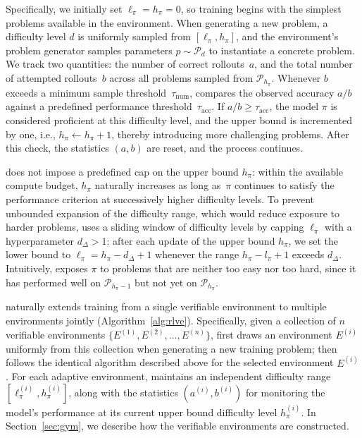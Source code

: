 \documentclass{article}
\theoremstyle{plain}
\theoremstyle{definition}
\theoremstyle{remark}
\begin{document}
Specifically, we initially set $\ell_\pi = h_\pi = 0$, so training begins with the simplest problems available in the environment.
When generating a new problem, a difficulty level $d$ is uniformly sampled from $[\ell_\pi, h_\pi]$, and the environment’s problem generator samples parameters $p \sim \mathcal{P}_{d}$ to instantiate a concrete problem.
We track two quantities: the number of correct rollouts~$a$, and the total number of attempted rollouts~$b$ across all problems sampled from $\mathcal{P}_{h_\pi}$.
Whenever $b$ exceeds a minimum sample threshold~$\tau_{\mathrm{num}}$, \ours{} compares the observed accuracy $a / b$ against a predefined performance threshold~$\tau_{\mathrm{acc}}$.
If $a / b \ge \tau_{\mathrm{acc}}$, the model $\pi$ is considered proficient at this difficulty level, and the upper bound is incremented by one, i.e., $h_\pi \leftarrow h_\pi + 1$, thereby introducing more challenging problems.
After this check, the statistics $(a, b)$ are reset, and the process continues.

\ours{} does not impose a predefined cap on the upper bound $h_\pi$:
within the available compute budget, $h_\pi$ naturally increases as long as~$\pi$ continues to satisfy the performance criterion at successively higher difficulty levels.
To prevent unbounded expansion of the difficulty range, which would reduce exposure to harder problems, \ours{} uses a sliding window of difficulty levels by capping $\ell_\pi$ with a hyperparameter $d_{\Delta} > 1$:
after each update of the upper bound $h_\pi$, we set the lower bound to $\ell_\pi = h_\pi - d_{\Delta} + 1$ whenever the range $h_{\pi} - l_{\pi}+1$ exceeds $d_{\Delta}$. 
Intuitively, \ours{} exposes $\pi$ to problems that are neither too easy nor too hard, since it has performed well on $\mathcal{P}_{h_\pi-1}$ but not yet on $\mathcal{P}_{h_\pi}$.

\ours{} naturally extends training from a single verifiable environment to multiple environments jointly (Algorithm~\ref{alg:rlve}).
Specifically, given a collection of $n$ verifiable environments $\{E^{(1)}, E^{(2)}, \dots, E^{(n)}\}$, \ours{} first draws an environment $E^{(i)}$ uniformly from this collection when generating a new training problem;
\ours{} then follows the identical algorithm described above for the selected environment $E^{(i)}$.
For each adaptive environment, \ours{} maintains an independent difficulty range $[\ell_\pi^{(i)}, h_\pi^{(i)}]$, along with the statistics $(a^{(i)},b^{(i)})$ for monitoring the model’s performance at its current upper bound difficulty level $h_\pi^{(i)}$.
In Section~\ref{sec:gym}, we describe how the verifiable environments are constructed.
\end{document}
